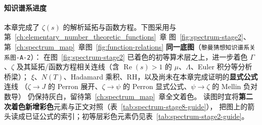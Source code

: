 \paragraph{知识谱系进度}
\label{sec:ch8_spectrum_progress}
本章完成了 $\zeta(s)$ 的解析延拓与函数方程。下图采用与第~\ref{ch:elementary_number_theoretic_functions}~章
图~\ref{fig:spectrum-stage2}、第~\ref{ch:spectrum_map}~章图~\ref{fig:function-relations}
\textbf{同一底图}（\texttt{黎曼猜想知识谱系关系图-A-2}）：
在图~\ref{fig:spectrum-stage2} 已着色的初等算术层之上，进一步着色 $\Gamma$、$\zeta$
及其延拓/函数方程相关连线（含 $\operatorname{Re}(s)>1$ 的 $\mu$、$\Lambda$、Euler 积分等分析桥梁）；
$\xi$、$N(T)$、Hadamard 乘积、RH，以及尚未在本章完成证明的\textbf{显式公式}连线
（$\zeta\to J$ 的 Perron 展开、$\zeta\to\psi$ 的 Perron 显式公式、$\psi\to\zeta$ 的 Mellin 负对数导）
仍保持灰白，留待第~\ref{ch:spectrum_map}~章全文着色。
读图时宜将\textbf{第二次着色新增彩色}元素与正文对照（表~\ref{tab:spectrum-stage8-guide}），
把图上的箭头读成已证公式的索引；初等层彩色元素仍见表~\ref{tab:spectrum-stage2-guide}。

\clearpage
\begin{figure}[p]
\centering
\def\spectrumStage{8}
\resizebox{\textwidth}{!}{%
%
}
\end{figure}
\clearpage
\noindent
{}
\label{fig:spectrum-stage8}

